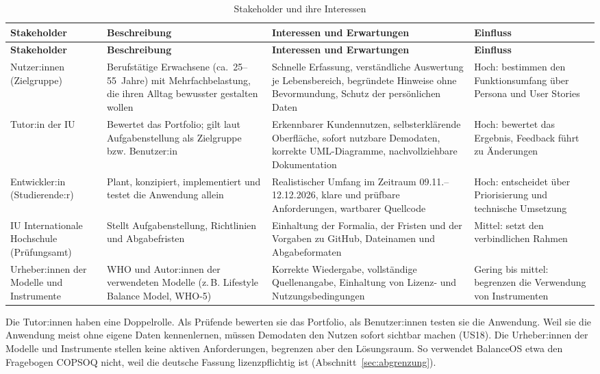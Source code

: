 \begingroup\tabsatz
\begin{longtable}{@{}L{2.6cm}L{4.2cm}L{5.0cm}L{3.1cm}@{}}
  \caption{Stakeholder und ihre Interessen}\label{tab:stakeholder}\\
  \toprule
  \textbf{Stakeholder} & \textbf{Beschreibung} & \textbf{Interessen und Erwartungen} & \textbf{Einfluss} \\
  \midrule
  \endfirsthead
  \toprule
  \textbf{Stakeholder} & \textbf{Beschreibung} & \textbf{Interessen und Erwartungen} & \textbf{Einfluss} \\
  \midrule
  \endhead
  \endfoot
  \bottomrule
  \endlastfoot
  Nutzer:innen (Zielgruppe)
    & Berufstätige Erwachsene (ca.~25--55~Jahre) mit Mehrfachbelastung, die ihren Alltag bewusster gestalten wollen
    & Schnelle Erfassung, verständliche Auswertung je Lebensbereich, begründete Hinweise ohne Bevormundung, Schutz der persönlichen Daten
    & Hoch: bestimmen den Funktionsumfang über Persona und User Stories \\
  \midrule
  Tutor:in der IU
    & Bewertet das Portfolio; gilt laut Aufgabenstellung als Zielgruppe bzw. Benutzer:in
    & Erkennbarer Kundennutzen, selbsterklärende Oberfläche, sofort nutzbare Demodaten, korrekte \ac{UML}-Diagramme, nachvollziehbare Dokumentation
    & Hoch: bewertet das Ergebnis, Feedback führt zu Änderungen \\
  \midrule
  Entwickler:in (Studierende:r)
    & Plant, konzipiert, implementiert und testet die Anwendung allein
    & Realistischer Umfang im Zeitraum 09.11.--12.12.2026, klare und prüfbare Anforderungen, wartbarer Quellcode
    & Hoch: entscheidet über Priorisierung und technische Umsetzung \\
  \midrule
  IU Internationale Hochschule (Prüfungsamt)
    & Stellt Aufgabenstellung, Richtlinien und Abgabefristen
    & Einhaltung der Formalia, der Fristen und der Vorgaben zu GitHub, Dateinamen und Abgabeformaten
    & Mittel: setzt den verbindlichen Rahmen \\
  \midrule
  Urheber:innen der Modelle und Instrumente
    & \ac{WHO} und Autor:innen der verwendeten Modelle (z.\,B. Lifestyle Balance Model, WHO-5)
    & Korrekte Wiedergabe, vollständige Quellenangabe, Einhaltung von Lizenz- und Nutzungsbedingungen
    & Gering bis mittel: begrenzen die Verwendung von Instrumenten \\
\end{longtable}
\endgroup
{}

Die Tutor:innen haben eine Doppelrolle. Als Prüfende bewerten sie das Portfolio, als Benutzer:innen testen sie die Anwendung. Weil sie die Anwendung meist ohne eigene Daten kennenlernen, müssen Demodaten den Nutzen sofort sichtbar machen (US18). Die Urheber:innen der Modelle und Instrumente stellen keine aktiven Anforderungen, begrenzen aber den Lösungsraum. So verwendet BalanceOS etwa den Fragebogen COPSOQ nicht, weil die deutsche Fassung lizenzpflichtig ist (Abschnitt~\ref{sec:abgrenzung}).

